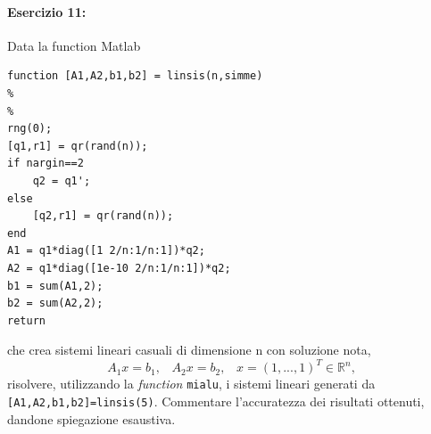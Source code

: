 \documentclass[12pt]{article}
\begin{document}
\paragraph{Esercizio 11:}Data la function Matlab \\
\begin{lstlisting}[frame=single]
function [A1,A2,b1,b2] = linsis(n,simme)
%
%
rng(0);
[q1,r1] = qr(rand(n));
if nargin==2
    q2 = q1'; 
else
    [q2,r1] = qr(rand(n));
end
A1 = q1*diag([1 2/n:1/n:1])*q2;
A2 = q1*diag([1e-10 2/n:1/n:1])*q2;
b1 = sum(A1,2);
b2 = sum(A2,2);
return
\end{lstlisting}
che crea sistemi lineari casuali di dimensione n con soluzione nota,
$$A_1x = b_1,\;\;\; A_2x = b_2, \;\;\;x = (1,...,1)^T \in \mathbb{R}^n,$$
risolvere, utilizzando la \textit{function} \texttt{mialu}, i sistemi lineari generati da \texttt{[A1,A2,b1,b2]=linsis(5)}. 
Commentare l’accuratezza dei risultati ottenuti, dandone spiegazione esaustiva.
\end{document}
